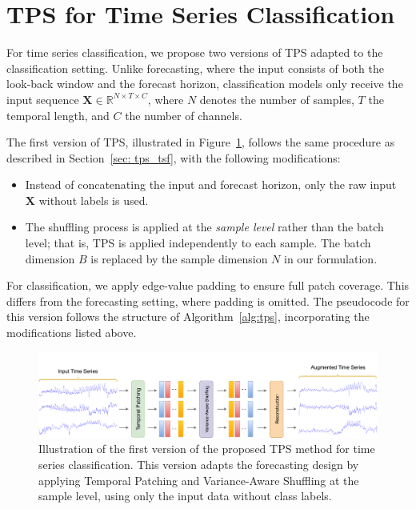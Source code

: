 \section{TPS for Time Series Classification} \label{sec:tps_tsc}


For time series classification, we propose two versions of TPS adapted to the classification setting. Unlike forecasting, where the input consists of both the look-back window and the forecast horizon, classification models only receive the input sequence $\mathbf{X} \in \mathbb{R}^{N \times T \times C}$, where $N$ denotes the number of samples, $T$ the temporal length, and $C$ the number of channels.

The first version of TPS, illustrated in Figure~\ref{fig:tpstsc1}, follows the same procedure as described in Section~\ref{sec: tps_tsf}, with the following modifications:

\begin{itemize}
    \item Instead of concatenating the input and forecast horizon, only the raw input $\mathbf{X}$ without labels is used.
    \item The shuffling process is applied at the \textit{sample level} rather than the batch level; that is, TPS is applied independently to each sample. The batch dimension $B$ is replaced by the sample dimension $N$ in our formulation.
\end{itemize}

For classification, we apply edge-value padding to ensure full patch coverage. This differs from the forecasting setting, where padding is omitted. The pseudocode for this version follows the structure of Algorithm~\ref{alg:tps}, incorporating the modifications listed above.


\begin{figure}[h!]
\centering
\includegraphics[page=1, width=1.0\textwidth, keepaspectratio]{./images/tsctps.png}
\caption{Illustration of the first version of the proposed TPS method for time series classification. This version adapts the forecasting design by applying Temporal Patching and Variance-Aware Shuffling at the sample level, using only the input data without class labels.} 
    \label{fig:tpstsc1}
\end{figure}



